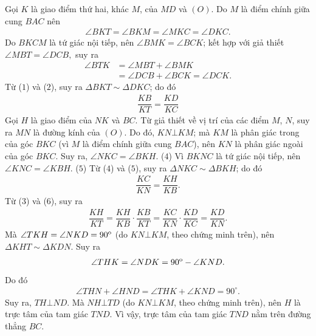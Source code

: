 \begin{multicols}{2}
\begin{figure}[H]
		\vspace*{-10pt}
	\end{figure}
	Gọi $K$ là giao điểm thứ hai, khác $M$, của $MD$ và $(O)$.
	\vskip 0.05cm
	Do $M$ là điểm chính giữa cung $BAC$ nên
	\begin{align*}
		\angle BKT \!=\! \angle BKM \!=\! \angle MKC \!=\! \angle DKC. \tag{$1$}
	\end{align*}
	Do $BKCM$ là tứ giác nội tiếp, nên $\angle BMK = \angle BCK$; kết hợp với giả thiết $\angle MBT = \angle DCB,$  suy ra
	\begin{align*}
		\angle BTK &= \angle MBT + \angle BMK \\
		&= \angle DCB + \angle BCK = \angle DCK. \tag{$2$}
	\end{align*}
	Từ ($1$) và ($2$), suy ra $\Delta BKT \sim  \Delta DKC$; do đó
	\begin{align*}
		\dfrac{{KB}}{{KT}} = \dfrac{{KD}}{{KC}} \tag{$3$}
	\end{align*}
	Gọi $H$ là giao điểm của $NK$ và $BC$.
	\vskip 0.05cm
	Từ giả thiết về vị trí của các điểm $M$, $N$, suy ra $MN$ là đường kính của $(O)$. Do đó, $KN \bot KM$; mà $KM$ là phân giác trong của góc $BKC$ (vì $M$ là điểm chính giữa cung $BAC$), nên $KN$ là phân giác ngoài của góc $BKC$. Suy ra, $\angle NKC = \angle BKH$. \hfill ($4$)
	\vskip 0.05cm 
	Vì $BKNC$ là tứ giác nội tiếp, nên $\angle KNC = \angle KBH.$ \hfill ($5$)
	\vskip 0.05cm
	Từ ($4$) và ($5$), suy ra $\Delta NKC \sim \Delta BKH$; do đó
	\begin{align*}
		\dfrac{{KC}}{{KN}} = \dfrac{{KH}}{{KB}}. \tag{$6$}
	\end{align*}
	Từ ($3$) và ($6$), suy ra
	\begin{align*}
		\dfrac{{KH}}{{KT}} = \dfrac{{KH}}{{KB}} \cdot \dfrac{{KB}}{{KT}} = \dfrac{{KC}}{{KN}} \cdot \dfrac{{KD}}{{KC}} = \dfrac{{KD}}{{KN}}.
	\end{align*}
	Mà  $\angle TKH = \angle NKD = {90^{\rm{o}}}$ (do $KN \bot KM$, theo chứng minh trên), nên $\Delta KHT \sim  \Delta KDN$. Suy ra
	\begin{align*}
		\angle THK = \angle NDK = {90^{\rm{o}}} - \angle KND.
	\end{align*}
	Do đó
	\begin{align*}
		\angle THN + \angle HND = \angle THK + \angle KND = {90^\circ}.
	\end{align*}
	Suy ra, $TH \bot ND$. Mà $NH \bot TD$ (do $KN \bot KM$, theo chứng minh trên), nên $H$ là trực tâm của tam giác $TND$. Vì vậy, trực tâm của tam giác $TND$ nằm trên đường thẳng $BC$.

\end{multicols}
